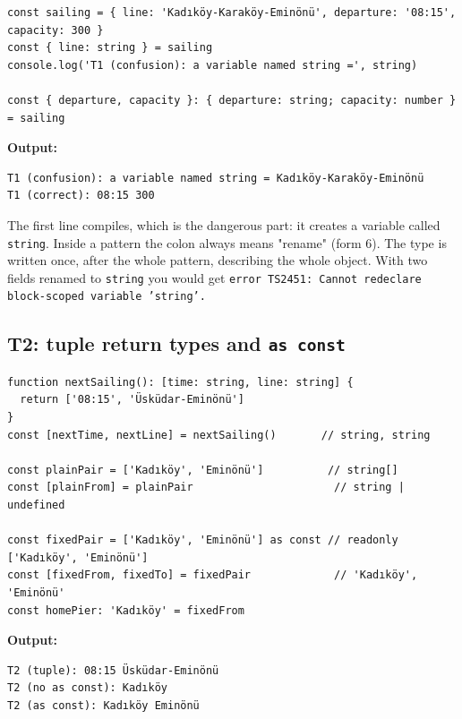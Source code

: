 \documentclass[
  10pt,
]{article}
\begin{document}
\begin{verbatim}
const sailing = { line: 'Kadıköy-Karaköy-Eminönü', departure: '08:15', capacity: 300 }
const { line: string } = sailing
console.log('T1 (confusion): a variable named string =', string)

const { departure, capacity }: { departure: string; capacity: number } = sailing
\end{verbatim}

\textbf{Output:}

\begin{verbatim}
T1 (confusion): a variable named string = Kadıköy-Karaköy-Eminönü
T1 (correct): 08:15 300
\end{verbatim}

The first line compiles, which is the dangerous part: it creates a
variable called \texttt{string}. Inside a pattern the colon always means
"rename" (form 6). The type is written once, after the whole pattern,
describing the whole object. With two fields renamed to \texttt{string}
you would get
\texttt{error TS2451:\allowbreak{} Cannot redeclare block-scoped variable 'string'.\allowbreak{}}

\hypertarget{t2-tuple-return-types-and-as-const}{%
\subsection{\texorpdfstring{T2: tuple return types and
\texttt{as const}}{T2: tuple return types and }}\label{t2-tuple-return-types-and-as-const}}

\begin{verbatim}
function nextSailing(): [time: string, line: string] {
  return ['08:15', 'Üsküdar-Eminönü']
}
const [nextTime, nextLine] = nextSailing()       // string, string

const plainPair = ['Kadıköy', 'Eminönü']          // string[]
const [plainFrom] = plainPair                      // string | undefined

const fixedPair = ['Kadıköy', 'Eminönü'] as const // readonly ['Kadıköy', 'Eminönü']
const [fixedFrom, fixedTo] = fixedPair             // 'Kadıköy', 'Eminönü'
const homePier: 'Kadıköy' = fixedFrom
\end{verbatim}

\textbf{Output:}

\begin{verbatim}
T2 (tuple): 08:15 Üsküdar-Eminönü
T2 (no as const): Kadıköy
T2 (as const): Kadıköy Eminönü
\end{verbatim}
\end{document}
